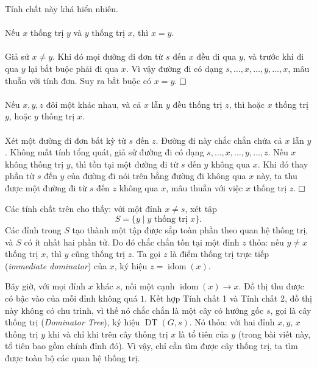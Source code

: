 \documentclass[11pt]{article}
\newcommand{\proofbox}{\ensuremath{\vcenter{\hrule height 0.45pt
  \hbox{\vrule width 0.45pt height 6pt\kern 6pt\vrule width 0.45pt}
  \hrule height 0.45pt}}}
\begin{document}
Tính chất này khá hiển nhiên.

\paragraph{}
Nếu \(x\) thống trị \(y\) và \(y\) thống trị \(x\), thì \(x=y\).

\paragraph{}
Giả sử \(x\ne y\). Khi đó mọi đường đi đơn từ \(s\) đến \(x\) đều đi qua \(y\),
và trước khi đi qua \(y\) lại bắt buộc phải đi qua \(x\). Vì vậy đường đi có
dạng \(s,\ldots,x,\ldots,y,\ldots,x\), mâu thuẫn với tính đơn. Suy ra bắt buộc
có \(x=y\). \proofbox

\paragraph{}
Nếu \(x,y,z\) đôi một khác nhau, và cả \(x\) lẫn \(y\) đều thống trị \(z\), thì
hoặc \(x\) thống trị \(y\), hoặc \(y\) thống trị \(x\).

\paragraph{}
Xét một đường đi đơn bất kỳ từ \(s\) đến \(z\). Đường đi này chắc chắn chứa cả
\(x\) lẫn \(y\). Không mất tính tổng quát, giả sử đường đi có dạng
\(s,\ldots,x,\ldots,y,\ldots,z\). Nếu \(x\) không thống trị \(y\), thì tồn tại
một đường đi từ \(s\) đến \(y\) không qua \(x\). Khi đó thay phần từ \(s\) đến
\(y\) của đường đi nói trên bằng đường đi không qua \(x\) này, ta thu được một
đường đi từ \(s\) đến \(z\) không qua \(x\), mâu thuẫn với việc \(x\) thống trị
\(z\). \proofbox

Các tính chất trên cho thấy: với một đỉnh \(x\ne s\), xét tập
\[
S=\{y\mid y\text{ thống trị }x\}.
\]
Các đỉnh trong \(S\) tạo thành một tập được sắp toàn phần theo quan hệ thống
trị, và \(S\) có ít nhất hai phần tử. Do đó chắc chắn tồn tại một đỉnh \(z\)
thỏa: nếu \(y\ne x\) thống trị \(x\), thì \(y\) cũng thống trị \(z\). Ta gọi
\(z\) là điểm thống trị trực tiếp (\emph{immediate dominator}) của \(x\), ký
hiệu \(z=\operatorname{idom}(x)\).

Bây giờ, với mọi đỉnh \(x\) khác \(s\), nối một cạnh
\(\operatorname{idom}(x)\to x\). Đồ thị thu được có bậc vào của mỗi đỉnh không
quá \(1\). Kết hợp Tính chất 1 và Tính chất 2, đồ thị này không có chu trình,
vì thế nó chắc chắn là một cây có hướng gốc \(s\), gọi là cây thống trị
(\emph{Dominator Tree}), ký hiệu \(\operatorname{DT}(G,s)\). Nó thỏa: với hai
đỉnh \(x,y\), \(x\) thống trị \(y\) khi và chỉ khi trên cây thống trị \(x\) là
tổ tiên của \(y\) (trong bài viết này, tổ tiên bao gồm chính đỉnh đó). Vì vậy,
chỉ cần tìm được cây thống trị, ta tìm được toàn bộ các quan hệ thống trị.
\end{document}
